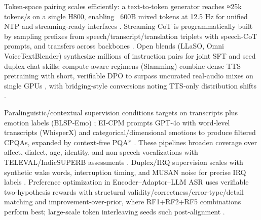 Token‑space pairing scales efficiently: a text‑to‑token generator reaches ≈25k tokens/s on a single H800, enabling ~600B mixed tokens at 12.5 Hz for unified NTP and streaming‑ready interfaces \cite{zeng2024scalingspeechtextpretrainingsyntheticint}. Streaming CoT is programmatically built by sampling prefixes from speech/transcript/translation triplets with speech‑CoT prompts, and transfers across backbones \cite{guo2025streamuniachievingstreamingspeechtransla}. Open blends (LLaSO, Omni VoiceTextBlender) synthesize millions of instruction pairs for joint SFT and seed duplex chat skills; compute‑aware regimens (Slamming) combine dense TTS pretraining with short, verifiable DPO to surpass uncurated real‑audio mixes on single GPUs \cite{peng2025voicetextblenderaugmentinglargelanguagem,fang2025llamaomniseamlessspeechinteractionlargel,maimon2025slammingtrainingspeechlanguagemodelonegp}, with bridging‑style conversions noting TTS‑only distribution shifts \cite{wang2023slmbridgethingapbetweenspeechtextfoundat}.

Paralinguistic/contextual supervision conditions targets on transcripts plus emotion labels (BLSP‑Emo) \cite{wang2024blspemotowardsempatheticlargespeechlangu}; EI‑CPM prompts GPT‑4o with word‑level transcripts (WhisperX) and categorical/dimensional emotions to produce filtered CPQAs, expanded by context‑free PQA* \cite{wang2025incorporatingcontextualparalinguisticund}. These pipelines broaden coverage over affect, dialect, age, identity, and non‑speech vocalizations with TELEVAL/IndicSUPERB assessments \cite{chen2025goatslmspokenlanguagemodelparalinguistic,entry2025indicsuperbspeechprocessinguniversalperf,tian2025espnetspeechlmopenspeechlanguagemodeltoo}. Duplex/IRQ supervision scales with synthetic wake words, interruption timing, and MUSAN noise for precise IRQ labels \cite{ma2024languagemodelcanlistenwhilespeaking}. Preference optimization in Encoder–Adaptor–LLM ASR uses verifiable two‑hypothesis rewards with structural validity/correctness/error‑type/detail matching and improvement‑over‑prior, where RF1+RF2+RF5 combinations perform best; large‑scale token interleaving seeds such post‑alignment \cite{li2025seewossubmissionmlcslmlessonslearnedspee,zeng2024scalingspeechtextpretrainingsyntheticint}.

